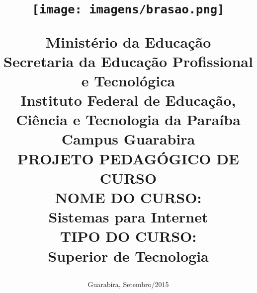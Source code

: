 

\setcounter{secnumdepth}{4}



\title{  \vspace{-0.8in} 
\begin{figure}[!htb]
\centering
\texttt{[image: imagens/brasao.png]}
\end{figure}
 \Large  Minist\'erio da Educa\c{c}\~ao  \\
 Secretaria da Educa\c{c}\~ao Profissional e Tecnol\'ogica   \\
Instituto Federal de Educa\c{c}\~ao, Ci\^encia e Tecnologia da Para\'iba \\
Campus Guarabira\\
\vspace{3cm}
\bf \large PROJETO PEDAG\'OGICO DE CURSO\\
\vspace{2cm}
\normalsize NOME DO CURSO:\\
\large Sistemas para Internet\\
\vspace{2cm}
\normalsize TIPO DO CURSO:\\
\large Superior de Tecnologia}


 \vspace{2cm}
\large
\date{\vspace{3.6cm}Guarabira, Setembro/2015}
\maketitle
\normalsize
\thispagestyle{empty}

\tableofcontents





